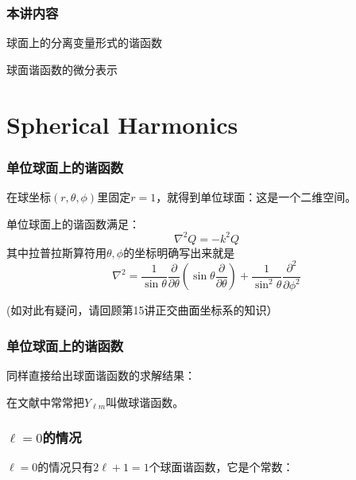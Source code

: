 \documentclass[CJK]{beamer}
\date{}
\begin{document}
  \bch
{}

\begin{frame}
\frametitle{本讲内容}

\bitem
\item{球面上的分离变量形式的谐函数}
\item{球面谐函数的微分表示}
\eitem

\end{frame}


\section{Spherical Harmonics}


\begin{frame}
\frametitle{单位球面上的谐函数}

在球坐标$(r,\theta,\phi)$里固定$r=1$，就得到单位球面：这是一个二维空间。

\skipline

单位球面上的谐函数满足：
$$ \nabla^2Q = -k^2Q $$
其中拉普拉斯算符用$\theta,\phi$的坐标明确写出来就是
$$ \nabla^2 = \frac{1}{\sin\theta}\frac{\partial}{\partial\theta}\left(\sin\theta\frac{\partial}{\partial\theta}\right) + \frac{1}{\sin^2\theta}\frac{\partial^2}{\partial\phi^2} $$

{\scriptsize (如对此有疑问，请回顾第15讲正交曲面坐标系的知识）}

\end{frame}



\begin{frame}
\frametitle{单位球面上的谐函数}

同样直接给出球面谐函数的求解结果：
\skiplines
{}

在文献中常常把$Y_{\ell m}$叫做{\blue 球谐函数}。


\end{frame}




\begin{frame}
\frametitle{$\ell = 0$的情况}

$\ell = 0$的情况只有$2\ell+1=1$个球面谐函数，它是个常数：



\end{frame}
\end{document}
